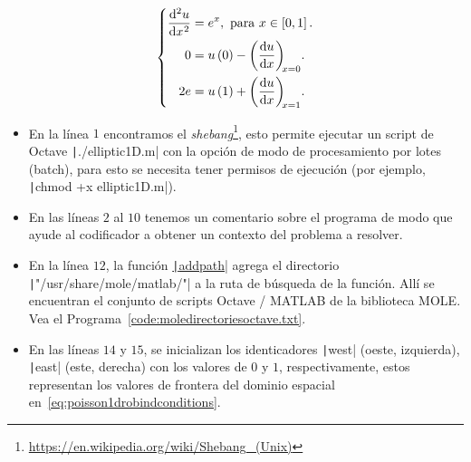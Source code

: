 \begin{equation}\label{eq:poisson1drobindconditions}
    \left\{
    \begin{aligned}
        \diff[2]{u}{x}
         & =e^{x},
        \text{ para }x\in\left[0,1\right].     \\
        0
         & = u\left(0\right)-\diff{u}{x}[x=0]. \\
        2e
         & =u\left(1\right)+\diff{u}{x}[x=1].
    \end{aligned}
    \right.
\end{equation}

\begin{itemize}
    \item

          En la línea $1$ encontramos el
          \emph{shebang}\footnote{\url{https://en.wikipedia.org/wiki/Shebang_(Unix)}},
          esto permite ejecutar un script de Octave
          \texttt|./elliptic1D.m| con la opción de modo de
          procesamiento por lotes (batch), para esto se necesita
          tener permisos de ejecución (por ejemplo,
          \texttt|chmod +x elliptic1D.m|).

    \item

          En las líneas $2$ al $10$ tenemos un comentario sobre el
          programa de modo que ayude al codificador a obtener un
          contexto del problema a resolver.

    \item

          En la línea $12$, la función
          \href{https://docs.octave.org/v9.3.0/Manipulating-the-Load-Path.html#index-addpath}{\texttt|addpath|}
          agrega el directorio
          \texttt|"/usr/share/mole/matlab/"| a la ruta de
          búsqueda de la función.
          Allí se encuentran el conjunto de scripts Octave / MATLAB
          de la biblioteca MOLE.
          Vea el Programa~\ref{code:moledirectoriesoctave.txt}.

    \item

          En las líneas $14$ y $15$, se inicializan los identicadores
          \texttt|west| (oeste, izquierda),
          \texttt|east| (este, derecha) con los valores
          de $0$ y $1$, respectivamente, estos representan los
          valores de frontera del dominio espacial
          en~\eqref{eq:poisson1drobindconditions}.


\end{itemize}
